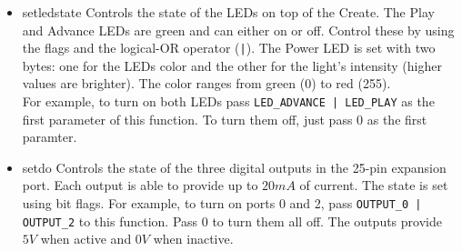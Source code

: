 \documentclass {article}
\begin{document}
\begin {itemize}
  \item {} {setledstate}
        Controls the state of the LEDs on top of the Create.  The Play and Advance LEDs are green
        and can either on or off.  Control these by using the \oiled flags and the logical-OR
        operator ({\tt |}).  The Power LED is set with two bytes: one for the LEDs color and the
        other for the light's intensity (higher values are brighter).  The color ranges from green
        (0) to red (255). \\
        For example, to turn on both LEDs pass {\tt LED\_ADVANCE | LED\_PLAY} as the first parameter
        of this function.  To turn them off, just pass 0 as the first paramter. \\
        \retnorm

  \item {} {setdo}
        Controls the state of the three digital outputs in the 25-pin expansion port.  Each output
        is able to provide up to $20mA$ of current.  The state is set using bit flags.  For example,
        to turn on ports 0 and 2, pass {\tt OUTPUT\_0 | OUTPUT\_2} to this function.  Pass 0 to turn
        them all off. The outputs provide $5V$ when active and $0V$ when inactive. \\
        \retnorm


\end{itemize}
\end{document}
